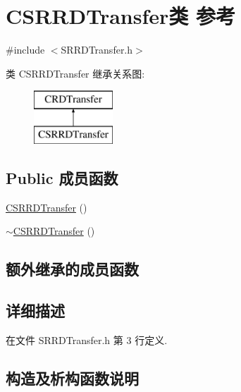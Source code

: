 \hypertarget{class_c_s_r_r_d_transfer}{}\section{C\+S\+R\+R\+D\+Transfer类 参考}
\label{class_c_s_r_r_d_transfer}


{\ttfamily \#include $<$S\+R\+R\+D\+Transfer.\+h$>$}

类 C\+S\+R\+R\+D\+Transfer 继承关系图\+:\begin{figure}[H]
\begin{center}
\leavevmode
\includegraphics[height=2.000000cm]{class_c_s_r_r_d_transfer}
\end{center}
\end{figure}
\subsection*{Public 成员函数}
\begin{DoxyCompactItemize}
\item 
\hyperlink{class_c_s_r_r_d_transfer_a303368d342837dcc352b92ec9f3e887a}{C\+S\+R\+R\+D\+Transfer} ()
\item 
\hyperlink{class_c_s_r_r_d_transfer_a7bfdc212714609526efcd147a870259f}{$\sim$\+C\+S\+R\+R\+D\+Transfer} ()
\end{DoxyCompactItemize}
\subsection*{额外继承的成员函数}


\subsection{详细描述}


在文件 S\+R\+R\+D\+Transfer.\+h 第 3 行定义.



\subsection{构造及析构函数说明}
\mbox{\label{class_c_s_r_r_d_transfer_a303368d342837dcc352b92ec9f3e887a}} 
